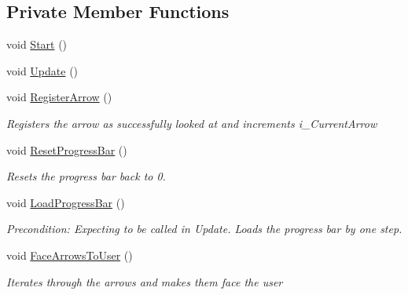 \subsection*{Private Member Functions}
\begin{DoxyCompactItemize}
\item 
void \mbox{\hyperlink{class_stage1_a22cb4953258834766118cccf6637bf6e}{Start}} ()
\item 
void \mbox{\hyperlink{class_stage1_a31a6ea5ef3ab028a99be7116cd90e37f}{Update}} ()
\item 
void \mbox{\hyperlink{class_stage1_aa992bad0fdb8df10f5ea6689ef8863ae}{Register\+Arrow}} ()
\begin{DoxyCompactList}\small\item\em Registers the arrow as successfully looked at and increments {\ttfamily i\+\_\+\+Current\+Arrow} \end{DoxyCompactList}\item 
void \mbox{\hyperlink{class_stage1_ac86ffd4a366e400042b42869b9282594}{Reset\+Progress\+Bar}} ()
\begin{DoxyCompactList}\small\item\em Resets the progress bar back to 0. \end{DoxyCompactList}\item 
void \mbox{\hyperlink{class_stage1_af625f5fcec1c9ac7a6fd6d74e437c13e}{Load\+Progress\+Bar}} ()
\begin{DoxyCompactList}\small\item\em Precondition\+: Expecting to be called in Update. Loads the progress bar by one step. \end{DoxyCompactList}\item 
void \mbox{\hyperlink{class_stage1_a6792b3b46499c0c5a6bf63031f6783b7}{Face\+Arrows\+To\+User}} ()
\begin{DoxyCompactList}\small\item\em Iterates through the arrows and makes them face the user \end{DoxyCompactList}\end{DoxyCompactItemize}

